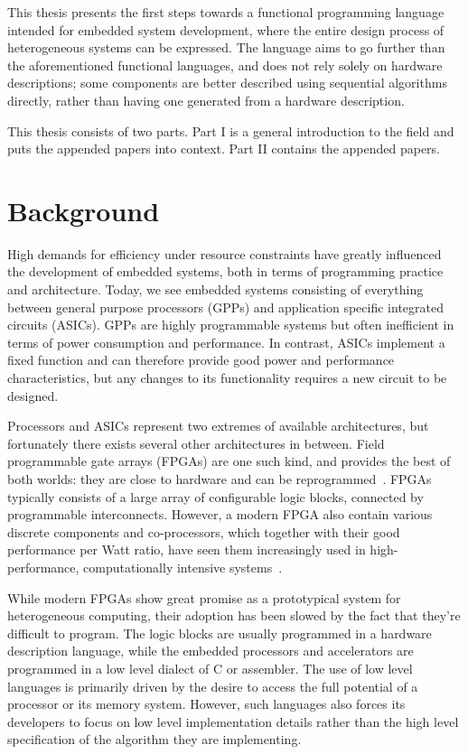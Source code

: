 This thesis presents the first steps towards a functional programming language intended for embedded system development, where the entire design process of heterogeneous systems can be expressed. The language aims to go further than the aforementioned functional languages, and does not rely solely on hardware descriptions; some components are better described using sequential algorithms directly, rather than having one generated from a hardware description.

This thesis consists of two parts. Part I is a general introduction to the field and puts the appended papers into context. Part II contains the appended papers.


\section{Background}
\label{background}

High demands for efficiency under resource constraints have greatly influenced the development of embedded systems, both in terms of programming practice and architecture. Today, we see embedded systems consisting of everything between general purpose processors (GPPs) and application specific integrated circuits (ASICs). GPPs are highly programmable systems but often inefficient in terms of power consumption and performance. In contrast, ASICs implement a fixed function and can therefore provide good power and performance characteristics, but any changes to its functionality requires a new circuit to be designed. 

Processors and ASICs represent two extremes of available architectures, but fortunately there exists several other architectures in between. Field programmable gate arrays (FPGAs) are one such kind, and provides the best of both worlds: they are close to hardware and can be reprogrammed~\cite{bacon2013}. FPGAs typically consists of a large array of configurable logic blocks, connected by programmable interconnects. However, a modern FPGA also contain various discrete components and co-processors, which together with their good performance per Watt ratio, have seen them increasingly used in high-performance, computationally intensive systems~\cite{mcmillan2014}.

While modern FPGAs show great promise as a prototypical system for heterogeneous computing, their adoption has been slowed by the fact that they're difficult to program. The logic blocks are usually programmed in a hardware description language, while the embedded processors and accelerators are programmed in a low level dialect of C or assembler. The use of low level languages is primarily driven by the desire to access the full potential of a processor or its memory system. However, such languages also forces its developers to focus on low level implementation details rather than the high level specification of the algorithm they are implementing.

